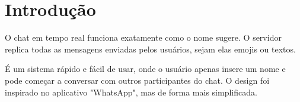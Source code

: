 \chapter{Introdução}
\label{ch:introducao}
\begin{resumocapitulo}
O chat em tempo real funciona exatamente como o nome sugere. O servidor replica todas as mensagens enviadas pelos usuários, sejam elas emojis ou textos.

É um sistema rápido e fácil de usar, onde o usuário apenas insere um nome e pode começar a conversar com outros participantes do chat. O design foi inspirado no aplicativo "WhatsApp", mas de forma mais simplificada. 
\end{resumocapitulo}


